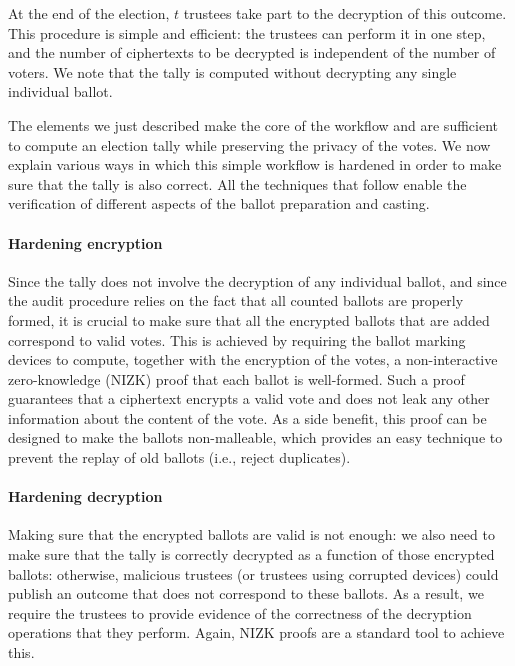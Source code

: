 At the end of the election, $t$ trustees take part to the decryption
of this outcome. This procedure is simple and efficient: the trustees
can perform it in one step, and the number of ciphertexts to be
decrypted is independent of the number of voters. We note that the
tally is computed without decrypting any single individual ballot.

The elements we just described make the core of the workflow and are
sufficient to compute an election tally while preserving the privacy
of the votes. We now explain various ways in which this simple
workflow is hardened in order to make sure that the tally is also
correct. All the techniques that follow enable the verification of
different aspects of the ballot preparation and casting.

\paragraph{Hardening encryption}
\label{sec:hardening-encryption}
Since the tally does not involve the decryption of any individual
ballot, and since the audit procedure relies on the fact that all
counted ballots are properly formed, it is crucial to make sure that
all the encrypted ballots that are added correspond to valid votes.
This is achieved by requiring the ballot marking devices to compute,
together with the encryption of the votes, a non-interactive
zero-knowledge (NIZK) proof that each ballot is well-formed. Such a
proof guarantees that a ciphertext encrypts a valid vote and does not
leak any other information about the content of the vote. As a side
benefit, this proof can be designed to make the ballots non-malleable,
which provides an easy technique to prevent the replay of old ballots
(i.e., reject duplicates).

\paragraph{Hardening decryption}
\label{sec:hardening-decryption}
Making sure that the encrypted ballots are valid is not enough: we
also need to make sure that the tally is correctly decrypted as a
function of those encrypted ballots: otherwise, malicious trustees (or
trustees using corrupted devices) could publish an outcome that does
not correspond to these ballots. As a result, we require the trustees
to provide evidence of the correctness of the decryption operations
that they perform.  Again, NIZK proofs are a standard tool to achieve
this.

